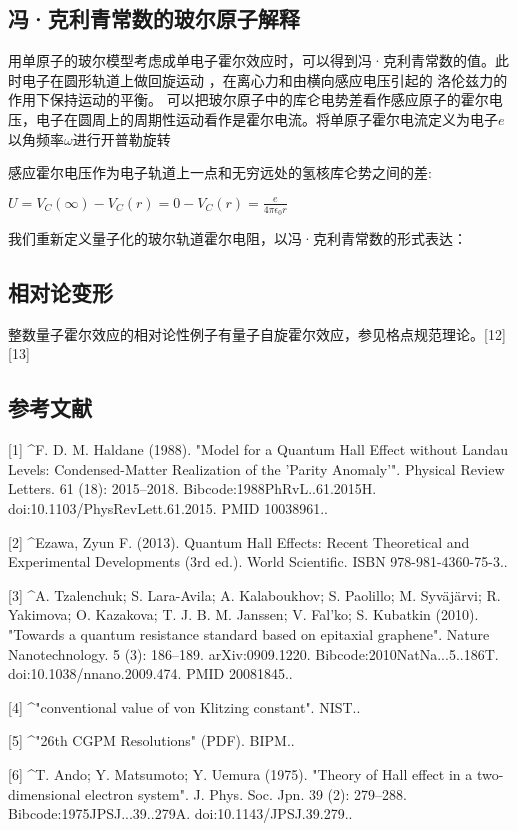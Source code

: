 \subsection{冯·克利青常数的玻尔原子解释}
用单原子的玻尔模型考虑成单电子霍尔效应时，可以得到冯·克利青常数的值。此时电子在圆形轨道上做回旋运动 ，在离心力和由横向感应电压引起的 洛伦兹力的作用下保持运动的平衡。 可以把玻尔原子中的库仑电势差看作感应原子的霍尔电压，电子在圆周上的周期性运动看作是霍尔电流。将单原子霍尔电流定义为电子$e$以角频率$\omega$进行开普勒旋转

感应霍尔电压作为电子轨道上一点和无穷远处的氢核库仑势之间的差:

$U = V_C(\infty) - V_C(r) = 0 - V_C(r) = \frac{e}{4 \pi \epsilon_0 r}$

我们重新定义量子化的玻尔轨道霍尔电阻，以冯·克利青常数的形式表达：


\subsection{相对论变形}
整数量子霍尔效应的相对论性例子有量子自旋霍尔效应，参见格点规范理论。[12][13]

\subsection{参考文献}
[1]
^F. D. M. Haldane (1988). "Model for a Quantum Hall Effect without Landau Levels: Condensed-Matter Realization of the 'Parity Anomaly'". Physical Review Letters. 61 (18): 2015–2018. Bibcode:1988PhRvL..61.2015H. doi:10.1103/PhysRevLett.61.2015. PMID 10038961..

[2]
^Ezawa, Zyun F. (2013). Quantum Hall Effects: Recent Theoretical and Experimental Developments (3rd ed.). World Scientific. ISBN 978-981-4360-75-3..

[3]
^A. Tzalenchuk; S. Lara-Avila; A. Kalaboukhov; S. Paolillo; M. Syväjärvi; R. Yakimova; O. Kazakova; T. J. B. M. Janssen; V. Fal'ko; S. Kubatkin (2010). "Towards a quantum resistance standard based on epitaxial graphene". Nature Nanotechnology. 5 (3): 186–189. arXiv:0909.1220. Bibcode:2010NatNa...5..186T. doi:10.1038/nnano.2009.474. PMID 20081845..

[4]
^"conventional value of von Klitzing constant". NIST..

[5]
^"26th CGPM Resolutions" (PDF). BIPM..

[6]
^T. Ando; Y. Matsumoto; Y. Uemura (1975). "Theory of Hall effect in a two-dimensional electron system". J. Phys. Soc. Jpn. 39 (2): 279–288. Bibcode:1975JPSJ...39..279A. doi:10.1143/JPSJ.39.279..

